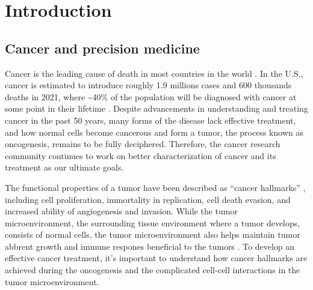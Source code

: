 \chapter{Introduction}
\label{chap:intro}












\section{Cancer and precision medicine}
Cancer is the leading cause of death in most countries in the world \cite{sungh_brayf:GlobalCancer2021}. In the U.S., cancer is estimated to introduce roughly 1.9 millions cases and 600 thousands deaths in 2021, where \textasciitilde40\% of the population will be diagnosed with cancer at some point in their lifetime \cite{siegelrl_jemala:CancerStatistics2021}. Despite advancements in understanding and treating cancer in the past 50 years, many forms of the disease lack effective treatment, and how normal cells become cancerous and form a tumor, the process known as oncogenesis, remains to be fully deciphered. Therefore, the cancer research community continues to work on better characterization of cancer and its treatment as our ultimate goals.

The functional properties of a tumor have been described as ``cancer hallmarks'' \cite{hanahand_weinbergra:HallmarksCancer2011}, including cell proliferation, immortality in replication, cell death evasion, and increased ability of angiogenesis and invasion. While the tumor microenvironment, the surrounding tissue environment where a tumor develops, consists of normal cells, the tumor microenvironment also helps maintain tumor abbrent growth and immune respones beneficial to the tumors \cite{hanahand_weinbergra:HallmarksCancer2011,quaildf_joyceja:MicroenvironmentalRegulation2013}. To develop an effective cancer treatment, it's important to understand how cancer hallmarks are achieved during the oncogenesis and the complicated cell-cell interactions in the tumor microenvironment.


